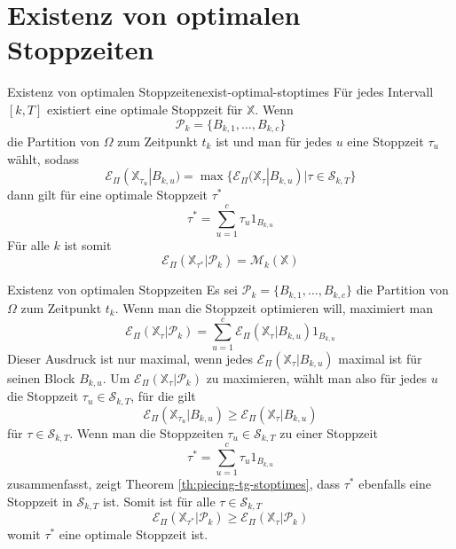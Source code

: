 \documentclass[11pt]{report} %
\begin{document}
\section{Existenz von optimalen Stoppzeiten}
\begin{Theorem}{Existenz von optimalen Stoppzeiten}{exist-optimal-stoptimes}
    Für jedes Intervall $[k, T]$ existiert eine optimale Stoppzeit für $\mathbb{X}$. Wenn $$\mathcal{P}_k=\{B_{k, 1}, \ldots, B_{k, c}\}$$ die Partition von $\Omega$ zum Zeitpunkt $t_k$ ist und man für jedes $u$ eine Stoppzeit $\tau_u$ wählt, sodass $$\mathcal{E}_\Pi(\mathbb{X}_{\tau_u}|B_{k, u})=\max\{\mathcal{E}_\Pi(\mathbb{X}_\tau|B_{k, u})|\tau\in\mathcal{S}_{k, T}\}$$dann gilt für eine optimale Stoppzeit $\tau^*$ $$\tau^*=\sum_{u=1}^{c}\tau_u1_{B_{k, u}}$$
    Für alle $k$ ist somit $$\mathcal{E}_\Pi(\mathbb{X}_{\tau^*}|\mathcal{P}_k)=\mathcal{M}_k(\mathbb{X})$$
\end{Theorem}
\begin{Beweis}{Existenz von optimalen Stoppzeiten}{}
    Es sei $\mathcal{P}_k=\{B_{k, 1}, \ldots, B_{k, c}\}$ die Partition von $\Omega$ zum Zeitpunkt $t_k$. Wenn man die Stoppzeit optimieren will, maximiert man $$\mathcal{E}_\Pi(\mathbb{X}_\tau|\mathcal{P}_k)=\sum_{u=1}^{c}\mathcal{E}_\Pi(\mathbb{X}_\tau|B_{k, u})1_{B_{k, u}}$$Dieser Ausdruck ist nur maximal, wenn jedes $\mathcal{E}_\Pi(\mathbb{X}_\tau|B_{k, u})$ maximal ist für seinen Block $B_{k, u}$. Um $\mathcal{E}_\Pi(\mathbb{X}_\tau|\mathcal{P}_k)$ zu maximieren, wählt man also für jedes $u$ die Stoppzeit $\tau_u\in \mathcal{S}_{k, T}$, für die gilt $$\mathcal{E}_\Pi(\mathbb{X}_{\tau_u}|B_{k, u})\geq\mathcal{E}_\Pi(\mathbb{X}_\tau|B_{k, u})$$ für $\tau\in\mathcal{S}_{k, T}$. Wenn man die Stoppzeiten $\tau_u\in\mathcal{S}_{k, T}$ zu einer Stoppzeit $$\tau^*=\sum_{u=1}^{c}\tau_u1_{B_{k, u}}
$$ zusammenfasst, zeigt Theorem \ref{th:piecing-tg-stoptimes}, dass $\tau^*$ ebenfalls eine Stoppzeit in $\mathcal{S}_{k, T}$ ist. Somit ist für alle $\tau\in\mathcal{S}_{k, T}$ $$\mathcal{E}_\Pi(\mathbb{X}_{\tau^*}|\mathcal{P}_k)\geq\mathcal{E}_\Pi(\mathbb{X}_\tau|\mathcal{P}_k)$$ womit $\tau^*$ eine optimale Stoppzeit ist.
\end{Beweis}
\end{document}

